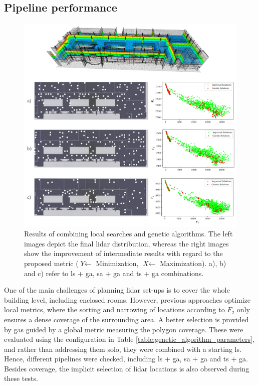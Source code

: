 \subsection{Pipeline performance}

\begin{figure}
    \centering
    \includegraphics[width=.88\linewidth]{figs/lidar_optimization/ga_results.png}
	\caption{Results of combining local searches and genetic algorithms. The left images depict the final \acrshort{lidar} distribution, whereas the right images show the improvement of intermediate results with regard to the proposed metric ($\textit{Y} \gets$ Minimization, $\textit{X} \gets$ Maximization). a), b) and c) refer to \acrshort{ls} + \acrshort{ga}, \acrshort{sa} + \acrshort{ga} and \acrshort{ts} + \acrshort{ga} combinations. }
	\label{fig:genetic_results}
\end{figure}

One of the main challenges of planning \acrshort{lidar} set-ups is to cover the whole building level, including enclosed rooms. However, previous approaches optimize local metrics, where the sorting and narrowing of locations according to $F_2$ only ensures a dense coverage of the surrounding area. A better selection is provided by \acrshort{ga}s guided by a global metric measuring the polygon coverage. These were evaluated using the configuration in Table \ref{table:genetic_algorithm_parameters}, and rather than addressing them solo, they were combined with a starting \acrshort{ls}. Hence, different pipelines were checked, including \acrshort{ls} + \acrshort{ga}, \acrshort{sa} + \acrshort{ga} and \acrshort{ts} + \acrshort{ga}. Besides coverage, the implicit selection of \acrshort{lidar} locations is also observed during these tests.

